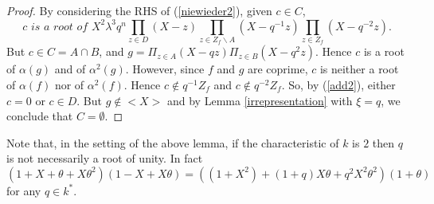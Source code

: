 \documentclass[a4paper, 11pt]{article}
\theoremstyle{definition}
\begin{document}
\begin{proof}
By considering the RHS of (\ref{niewieder2}), given $c\in C$, 
 \begin{equation}\label{add2} c \textit{ is a root of }X^2\lambda^3 q^{n}\prod_{z\in D}(X-z) \prod_{z\in Z_f\backslash A}(X-q^{-1}z) \prod_{z\in Z_f}(X-q^{-2}z).
 \end{equation}
 But $c \in C = A \cap B$, and $g = \Pi_{z \in A}(X - qz) \Pi_{z \in B}(X - q^2 z).$ Hence $c$ is a root of $\alpha(g)$ and of $\alpha^2(g)$. However, since $f$ and $g$ are coprime,  $c$ is neither a root of $\alpha(f)$ nor of $\alpha^2(f)$. Hence $c\notin q^{-1}Z_f$ and $c\notin q^{-2}Z_f$. So, by (\ref{add2}), either $c=0$ or $c\in D$. But $g\notin <X>$ and by Lemma \ref{irrepresentation} with $\xi=q$, we conclude that $C=\emptyset$.
\end{proof}

Note that, in the setting of the above lemma, if the characteristic of $k$ is $2$ then $q$ is not necessarily a root of unity. In fact
\begin{equation}
(1+X+\theta+X\theta^2)(1-X+X\theta)=((1+X^2)+(1+q)X\theta+q^2X^2\theta^2)(1+\theta)
\end{equation}
for any $q\in k^*$.
\end{document}
